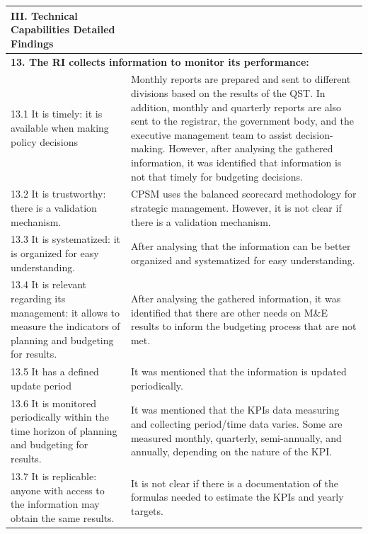 \documentclass[
  10pt,
]{book}
\begin{document}
\begin{table}
\centering
\begin{tabular}[t]{l|l}
\hline
III. Technical Capabilities Detailed Findings &  \\
\hline
\multicolumn{2}{l}{\textbf{13. The RI collects information to monitor its performance:}}\\
\hline
\hspace{1em}13.1 It is timely: it is available when making policy decisions & Monthly reports are prepared and sent to different divisions based on the results of the QST. In addition, monthly and quarterly reports are also sent to the registrar, the government body, and the executive management team to assist decision-making. However, after analysing the gathered information, it was identified that information is not that timely for budgeting decisions.\\
\hline
\hspace{1em}13.2 It is trustworthy: there is a validation mechanism. & CPSM uses the balanced scorecard methodology for strategic management. However, it is not clear if there is a validation mechanism.\\
\hline
\hspace{1em}13.3 It is systematized: it is organized for easy understanding. & After analysing that the information can be better organized and systematized for easy understanding.\\
\hline
\hspace{1em}13.4 It is relevant regarding its management: it allows to measure the indicators of planning and budgeting for results. & After analysing the gathered information, it was identified that there are other needs on M\&E results to inform the budgeting process that are not met.\\
\hline
\hspace{1em}13.5 It has a defined update period & It was mentioned that the information is updated periodically.\\
\hline
\hspace{1em}13.6 It is monitored periodically within the time horizon of planning and budgeting for results. & It was mentioned that the KPIs data measuring and collecting period/time data varies. Some are measured monthly, quarterly, semi-annually, and annually, depending on the nature of the KPI.\\
\hline
\hspace{1em}13.7 It is replicable: anyone with access to the information may obtain the same results. & It is not clear if there is a documentation of the formulas needed to estimate the KPIs and yearly targets.\\

\end{tabular}
\end{table}
\end{document}
